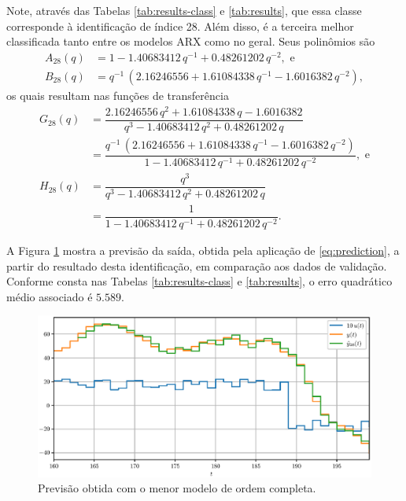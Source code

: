 \documentclass{ppgeesa}
\newcommand{\Prod}{\,}
\begin{document}
Note, através das Tabelas \ref{tab:results-class} e \ref{tab:results}, que essa classe corresponde à identificação de índice 28.
Além disso, é a terceira melhor classificada tanto entre os modelos ARX como no geral.
Seus polinômios são
\begin{align}
  A_{28}(q) &= 1   - \num{1.40683412} \Prod q^{-1} + \num{0.48261202} \Prod q^{-2}
  , \text{ e}
  \\
  B_{28}(q) &= q^{-1} \Prod \left(\num{2.16246556} + \num{1.61084338} \Prod q^{-1} - \num{1.6016382} \Prod q^{-2}\right)
  ,
\end{align}
os quais resultam nas funções de transferência
\begin{align}
  G_{28}(q) &= \dfrac{                   \num{2.16246556} \Prod q^2 + \num{1.61084338} \Prod q      - \num{1.6016382}                    }{q^3 - \num{1.40683412} \Prod q^2    + \num{0.48261202} \Prod q     }
  \\
            &= \dfrac{q^{-1} \Prod \left(\num{2.16246556}           + \num{1.61084338} \Prod q^{-1} - \num{1.6016382} \Prod q^{-2}\right)}{1   - \num{1.40683412} \Prod q^{-1} + \num{0.48261202} \Prod q^{-2}}
  , \text{ e}
  \\
  H_{28}(q) &= \dfrac{q^3}{q^3 - \num{1.40683412} \Prod q^2    + \num{0.48261202} \Prod q     }
  \\
            &= \dfrac{1  }{1   - \num{1.40683412} \Prod q^{-1} + \num{0.48261202} \Prod q^{-2}}
  .
\end{align}

A Figura \ref{fig:prediction} mostra a previsão da saída, obtida pela aplicação de \eqref{eq:prediction}, a partir do resultado desta identificação, em comparação aos dados de validação.
Conforme consta nas Tabelas \ref{tab:results-class} e \ref{tab:results}, o erro quadrático médio associado é $\num{5.589}$.
\begin{figure}[!htbp]
  \centering
  \includegraphics[width=\linewidth]{y_p_28}
  \caption{Previsão obtida com o menor modelo de ordem completa.}
  \label{fig:prediction}
\end{figure}
\end{document}
